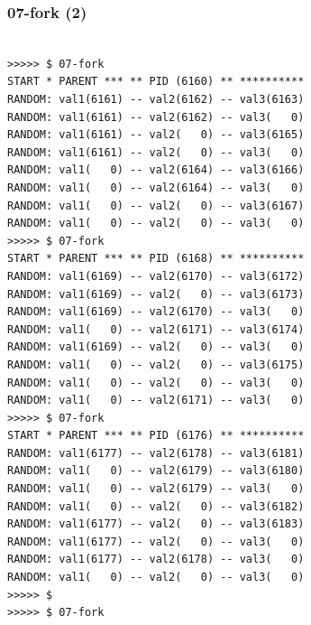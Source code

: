 \documentclass[xcolor=table, notheorems, hyperref={pdfpagelabels=false}]{beamer}
\begin{document}
\begin{frame}[fragile]
\frametitle{07-fork (2)}
\begin{lstlisting}[basicstyle=\ttfamily\tiny]

>>>>> $ 07-fork 
START * PARENT *** ** PID (6160) ** **********
RANDOM: val1(6161) -- val2(6162) -- val3(6163)
RANDOM: val1(6161) -- val2(6162) -- val3(   0)
RANDOM: val1(6161) -- val2(   0) -- val3(6165)
RANDOM: val1(6161) -- val2(   0) -- val3(   0)
RANDOM: val1(   0) -- val2(6164) -- val3(6166)
RANDOM: val1(   0) -- val2(6164) -- val3(   0)
RANDOM: val1(   0) -- val2(   0) -- val3(6167)
RANDOM: val1(   0) -- val2(   0) -- val3(   0)
>>>>> $ 07-fork 
START * PARENT *** ** PID (6168) ** **********
RANDOM: val1(6169) -- val2(6170) -- val3(6172)
RANDOM: val1(6169) -- val2(   0) -- val3(6173)
RANDOM: val1(6169) -- val2(6170) -- val3(   0)
RANDOM: val1(   0) -- val2(6171) -- val3(6174)
RANDOM: val1(6169) -- val2(   0) -- val3(   0)
RANDOM: val1(   0) -- val2(   0) -- val3(6175)
RANDOM: val1(   0) -- val2(   0) -- val3(   0)
RANDOM: val1(   0) -- val2(6171) -- val3(   0)
>>>>> $ 07-fork 
START * PARENT *** ** PID (6176) ** **********
RANDOM: val1(6177) -- val2(6178) -- val3(6181)
RANDOM: val1(   0) -- val2(6179) -- val3(6180)
RANDOM: val1(   0) -- val2(6179) -- val3(   0)
RANDOM: val1(   0) -- val2(   0) -- val3(6182)
RANDOM: val1(6177) -- val2(   0) -- val3(6183)
RANDOM: val1(6177) -- val2(   0) -- val3(   0)
RANDOM: val1(6177) -- val2(6178) -- val3(   0)
RANDOM: val1(   0) -- val2(   0) -- val3(   0)
>>>>> $ 
>>>>> $ 07-fork 

\end{lstlisting}
\end{frame}

\end{document}
